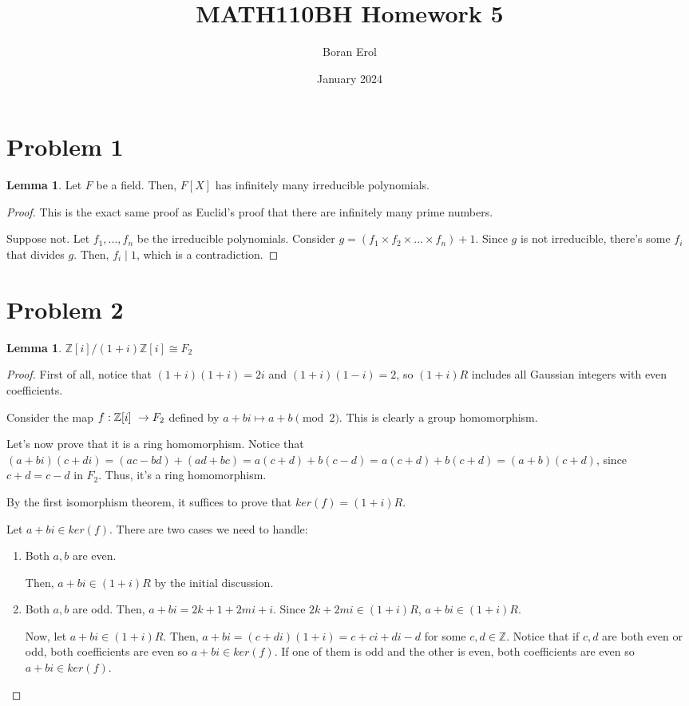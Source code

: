\documentclass{article}
\title{MATH110BH Homework 5}
\date{January 2024}
\author{Boran Erol}
\theoremstyle{definition}
\newtheorem{lemma}[theorem]{Lemma}
\def\gauss{\ensuremath\mathbb{Z}[i]\ }
\begin{document}
\maketitle

\section{Problem 1}

\begin{lemma}
    Let $F$ be a field. Then, $F[X]$ has infinitely many irreducible polynomials.
\end{lemma}
\begin{proof}
    This is the exact same proof as Euclid's proof that there are infinitely many prime numbers.

    Suppose not. Let $f_{1}, ..., f_{n}$ be the irreducible polynomials. Consider $g = (f_{1} \times f_{2} \times ... \times f_{n}) + 1$. Since $g$ is not irreducible, there's some $f_{i}$ that divides $g$. Then, $f_{i} \mid 1$, which is a contradiction.
\end{proof}

\section{Problem 2}

\begin{lemma}
    $\mathbb{Z}[i]/(1+i)\mathbb{Z}[i] \cong F_{2}$
\end{lemma}
\begin{proof}
    First of all, notice that $(1+i)(1+i) = 2i$ and $(1+i)(1-i) = 2$, so $(1+i)R$ includes all Gaussian integers with even coefficients.

    Consider the map $f: \gauss \to F_{2}$ defined by $a + bi \mapsto a + b \pmod 2$. This is clearly a group homomorphism. 

    Let's now prove that it is a ring homomorphism. Notice that $(a + bi)(c + di) = (ac - bd) + (ad + bc) = a(c+d) + b(c-d) = a(c+d) + b(c+d) = (a+b)(c+d)$, since $c+d = c-d$ in $F_{2}$. Thus, it's a ring homomorphism.

    By the first isomorphism theorem, it suffices to prove that $ker(f) = (1 + i)R$.

    Let $a + bi \in ker(f)$. There are two cases we need to handle:

    \begin{enumerate}
        \item Both $a,b$ are even.

            Then, $a + bi \in (1 + i)R$ by the initial discussion.
        \item Both $a,b$ are odd.
            Then, $a + bi = 2k + 1 + 2mi + i$. Since $2k + 2mi \in (1+i)R$, $a + bi \in (1 + i)R$.

    Now, let $a + bi \in (1 + i)R$. Then, $a + bi =(c + di)(1 + i) = c + ci + di -d $ for some $c,d \in \mathbb{Z}$. Notice that if $c,d$ are both even or odd, both coefficients are even so $a + bi \in ker(f)$. If one of them is odd and the other is even, both coefficients are even so $a + bi \in ker(f)$. 
    \end{enumerate}
\end{proof}
\end{document}
